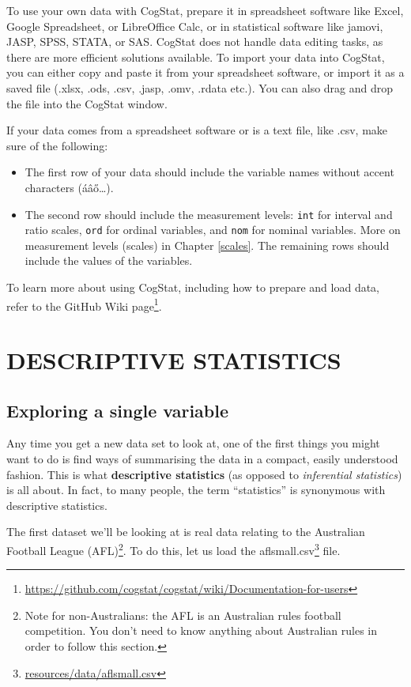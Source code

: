 \documentclass[
  11pt,
  a4paper,
  twoside,symmetric,openright]{book}
\providecommand{\tightlist}{%
  \setlength{\itemsep}{0pt}\setlength{\parskip}{0pt}}
\theoremstyle{break}
\theoremstyle{break}
\DeclareRobustCommand{\href}[2]{#2\footnote{\url{#1}}}
\begin{document}
To use your own data with CogStat, prepare it in spreadsheet software like Excel, Google Spreadsheet, or LibreOffice Calc, or in statistical software like jamovi, JASP, SPSS, STATA, or SAS. CogStat does not handle data editing tasks, as there are more efficient solutions available. To import your data into CogStat, you can either copy and paste it from your spreadsheet software, or import it as a saved file (.xlsx, .ods, .csv, .jasp, .omv, .rdata etc.). You can also drag and drop the file into the CogStat window.

If your data comes from a spreadsheet software or is a text file, like .csv, make sure of the following:

\begin{itemize}
\tightlist
\item
  The first row of your data should include the variable names without accent characters (áâő\ldots).
\item
  The second row should include the measurement levels: \texttt{int} for interval and ratio scales, \texttt{ord} for ordinal variables, and \texttt{nom} for nominal variables. More on measurement levels (scales) in Chapter \ref{scales}. The remaining rows should include the values of the variables.
\end{itemize}

To learn more about using CogStat, including how to prepare and load data, refer to the \href{https://github.com/cogstat/cogstat/wiki/Documentation-for-users}{GitHub Wiki page}.

\part*{DESCRIPTIVE STATISTICS}\label{part-descriptive-statistics}

\chapter{Exploring a single variable}\label{exploringavariable}

Any time you get a new data set to look at, one of the first things you might want to do is find ways of summarising the data in a compact, easily understood fashion. This is what \textbf{descriptive statistics} (as opposed to \emph{inferential statistics}) is all about. In fact, to many people, the term ``statistics'' is synonymous with descriptive statistics.

The first dataset we'll be looking at is real data relating to the Australian Football League (AFL)\footnote{Note for non-Australians: the AFL is an Australian rules football competition. You don't need to know anything about Australian rules in order to follow this section.}. To do this, let us load the \href{resources/data/aflsmall.csv}{aflsmall.csv} file.
\end{document}

